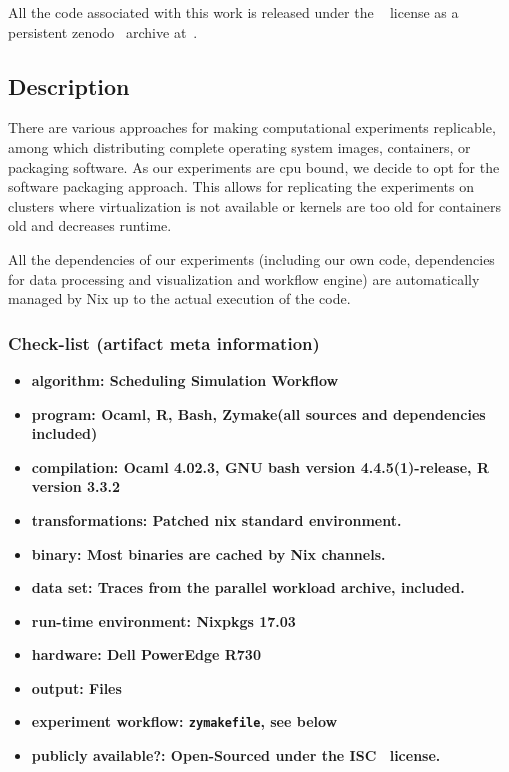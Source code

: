 \documentclass[sigconf,review]{acmart}
\begin{document}
All the code associated with this work is released under the ~\cite{isc}
license as a persistent zenodo~\cite{zenodo} archive at~\cite{zenodomain}.

\subsection{Description}

There are various approaches for making computational experiments replicable,
among which distributing complete operating system images, containers, or
packaging software. As our experiments are cpu bound, we decide to opt for the
software packaging approach. This allows for replicating the experiments on clusters where virtualization is not
available or kernels are too old for containers old and decreases runtime.

All the dependencies of our
experiments (including our own code, dependencies for data processing and
visualization and workflow engine) are automatically managed by Nix up to the
actual execution of the code.

\subsubsection{Check-list (artifact meta information)}

{\small
\begin{itemize}
  \item {\bf algorithm: Scheduling Simulation Workflow}
  \item {\bf program: Ocaml, R, Bash, Zymake(all sources and dependencies included)}
  \item {\bf compilation: Ocaml 4.02.3, GNU bash version 4.4.5(1)-release, R version 3.3.2}
  \item {\bf transformations: Patched nix standard environment.}
  \item {\bf binary: Most binaries are cached by Nix channels.}
  \item {\bf data set: Traces from the parallel workload archive, included.}
  \item {\bf run-time environment: Nixpkgs 17.03}
  \item {\bf hardware: Dell PowerEdge R730}
  \item {\bf output: Files}
  \item {\bf experiment workflow: \lstinline[basicstyle=\ttfamily\color{blue}]|zymakefile|, see below}
  \item {\bf publicly available?: Open-Sourced under the ISC~\cite{isc} license.}
\end{itemize}
}
\end{document}
